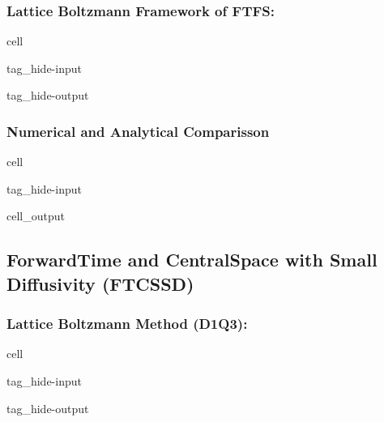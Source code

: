 \documentclass[letterpaper,10pt,english,openany,oneside]{jupyterBook}
\begin{document}
\subsubsection{Lattice Boltzmann Framework of FTFS:}
\label{\detokenize{LBM-Study/Convective-Equation:lattice-boltzmann-framework-of-ftfs}}
\begin{sphinxuseclass}{cell}
\begin{sphinxuseclass}{tag_hide-input}
\begin{sphinxuseclass}{tag_hide-output}
\end{sphinxuseclass}
\end{sphinxuseclass}
\end{sphinxuseclass}

\subsubsection{Numerical and Analytical Comparisson}
\label{\detokenize{LBM-Study/Convective-Equation:numerical-and-analytical-comparisson}}
\begin{sphinxuseclass}{cell}
\begin{sphinxuseclass}{tag_hide-input}\begin{sphinxVerbatimOutput}

\begin{sphinxuseclass}{cell_output}
\noindent{}

\end{sphinxuseclass}\end{sphinxVerbatimOutput}

\end{sphinxuseclass}
\end{sphinxuseclass}

\subsection{Forward\sphinxhyphen{}Time and Central\sphinxhyphen{}Space with Small Diffusivity (FTCS\sphinxhyphen{}SD)}
\label{\detokenize{LBM-Study/Convective-Equation:id2}}

\subsubsection{Lattice Boltzmann Method (D1Q3):}
\label{\detokenize{LBM-Study/Convective-Equation:lattice-boltzmann-method-d1q3}}
\begin{sphinxuseclass}{cell}
\begin{sphinxuseclass}{tag_hide-input}
\begin{sphinxuseclass}{tag_hide-output}
\end{sphinxuseclass}
\end{sphinxuseclass}
\end{sphinxuseclass}
\end{document}
